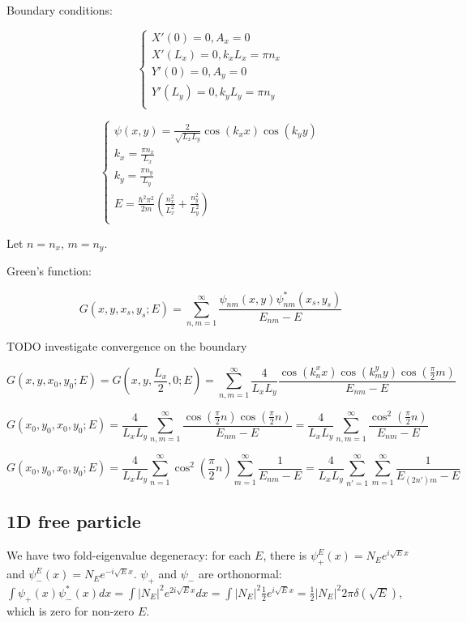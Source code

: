 \documentclass[12pt, a4paper]{article}
\begin{document}
Boundary conditions:

$$\begin{cases}
X'(0) = 0, A_x = 0 \\
X'(L_x) = 0, k_x L_x = \pi n_x \\
Y'(0) = 0, A_y = 0 \\
Y'(L_y) = 0, k_y L_y = \pi n_y \\
\end{cases}$$

$$\begin{cases}
\psi(x, y) = \frac{2}{\sqrt{L_x L_y}} \cos(k_x x) \cos(k_y y) \\
k_x = \frac{\pi n_x}{L_x} \\
k_y = \frac{\pi n_y}{L_y} \\
E = \frac{\hbar^2 \pi^2}{2 m} \left(\frac{n_x^2}{L_x^2} + \frac{n_y^2}{L_y^2} \right) \\
\end{cases}$$

Let $n = n_x$, $m = n_y$.

Green's function:

$$G(x, y, x_s, y_s; E) = \sum\limits_{n, m = 1}^\infty \frac{\psi_{nm}(x, y) \psi^*_{nm}(x_s, y_s)}{E_{nm} - E}$$

TODO investigate convergence on the boundary

$$G(x, y, x_0, y_0; E) = G(x, y, \frac{L_x}{2}, 0; E) = \sum\limits_{n, m = 1}^\infty \frac{4}{L_x L_y} \frac{\cos(k^x_n x) \cos(k^y_m y) \cos(\frac{\pi}{2}m)}{E_{nm} - E}$$

$$G(x_0, y_0, x_0, y_0; E) = \frac{4}{L_x L_y} \sum\limits_{n, m = 1}^\infty \frac{\cos(\frac{\pi}{2}n) \cos(\frac{\pi}{2}n)}{E_{nm} - E} = \frac{4}{L_x L_y} \sum\limits_{n, m = 1}^\infty \frac{\cos^2(\frac{\pi}{2}n)}{E_{nm} - E}$$

$$G(x_0, y_0, x_0, y_0; E) = \frac{4}{L_x L_y} \sum\limits_{n = 1}^\infty \cos^2(\frac{\pi}{2}n) \sum\limits_{m = 1}^\infty \frac{1}{E_{nm} - E} = \frac{4}{L_x L_y} \sum\limits_{n' = 1}^\infty \sum\limits_{m = 1}^\infty \frac{1}{E_{(2n')m} - E}$$

\subsection{1D free particle}
We have two fold-eigenvalue degeneracy: for each $E$, there is $\psi^E_+(x) = N_E e^{i \sqrt{E} x}$ and $\psi^E_-(x) = N_E e^{-i \sqrt{E} x}$. $\psi_+$ and $\psi_-$ are orthonormal: $\int \psi_+(x) \psi^*_-(x) dx = \int |N_E|^2 e^{2 i \sqrt{E} x} dx = \int |N_E|^2 \frac{1}{2} e^{i \sqrt{E} x} = \frac{1}{2} |N_E|^2 2 \pi \delta(\sqrt{E})$, which is zero for non-zero $E$.
\end{document}
